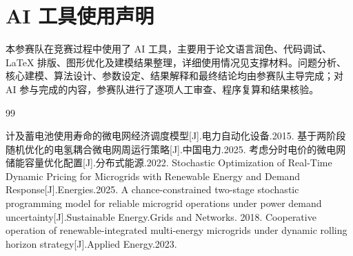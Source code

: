 
\section*{AI 工具使用声明}

本参赛队在竞赛过程中使用了 AI 工具，主要用于论文语言润色、代码调试、\LaTeX{} 排版、图形优化及建模结果整理，详细使用情况见支撑材料。问题分析、核心建模、算法设计、参数设定、结果解释和最终结论均由参赛队主导完成；对 AI 参与完成的内容，参赛队进行了逐项人工审查、程序复算和结果核验。

\vspace{0.5\baselineskip}
\begin{thebibliography}{99}

计及蓄电池使用寿命的微电网经济调度模型[J].电力自动化设备.2015.
基于两阶段随机优化的电氢耦合微电网周运行策略[J].中国电力.2025.
考虑分时电价的微电网储能容量优化配置[J].分布式能源.2022.
Stochastic Optimization of Real-Time Dynamic Pricing for Microgrids with Renewable Energy and Demand Response[J].Energies.2025.
A chance-constrained two-stage stochastic programming model for reliable microgrid operations under power demand uncertainty[J].Sustainable Energy.Grids and Networks. 2018.
Cooperative operation of renewable-integrated multi-energy microgrids under dynamic rolling horizon strategy[J].Applied Energy.2023.


\end{thebibliography}
